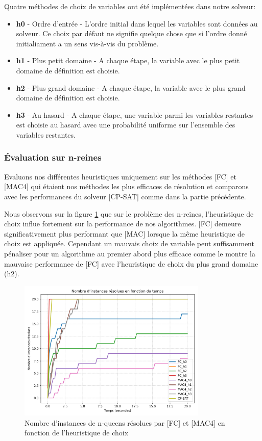\documentclass[14pt]{article}
\begin{document}
Quatre méthodes de choix de variables ont été implémentées dans notre solveur:
\begin{itemize}
    \item \textbf{h0} - Ordre d'entrée - L'ordre initial dans lequel les variables sont données au solveur. Ce choix par défaut ne signifie quelque chose que si l'ordre donné initialiament a un sens vis-à-vis du problème.
    \item \textbf{h1} - Plus petit domaine - A chaque étape, la variable avec le plus petit domaine de définition est choisie.
    \item \textbf{h2} - Plus grand domaine - A chaque étape, la variable avec le plus grand domaine de définition est choisie.
    \item \textbf{h3} - Au hasard - A chaque étape, une variable parmi les variables restantes est choisie au hasard avec une probabilité uniforme sur l'ensemble des variables restantes.
\end{itemize}


\subsubsection{Évaluation sur n-reines}

Evaluons nos différentes heuristiques uniquement sur les méthodes [FC] et [MAC4] qui étaient nos méthodes les plus efficaces de résolution et comparons avec les performances du solveur [CP-SAT] comme dans la partie précédente.

Nous observons sur la figure \ref{fig:n-queens-h1} que sur le problème des n-reines, l'heuristique de choix influe fortement sur la performance de nos algorithmes. [FC] demeure significativement plus performant que [MAC] lorsque la même heuristique de choix est appliquée. Cependant un mauvais choix de variable peut suffisamment pénaliser pour un algorithme au premier abord plus efficace comme le montre la mauvaise performance de [FC] avec l'heuristique de choix du plus grand domaine (h2).

\begin{figure}[H]
    \centering
    \includegraphics[width=0.8\textwidth]{Images/n-queens-h-MAC-FC.png}
    \caption{Nombre d'instances de n-queens résolues par [FC] et [MAC4] en fonction de l'heuristique de choix}
    \label{fig:n-queens-h1}
\end{figure}
\end{document}
